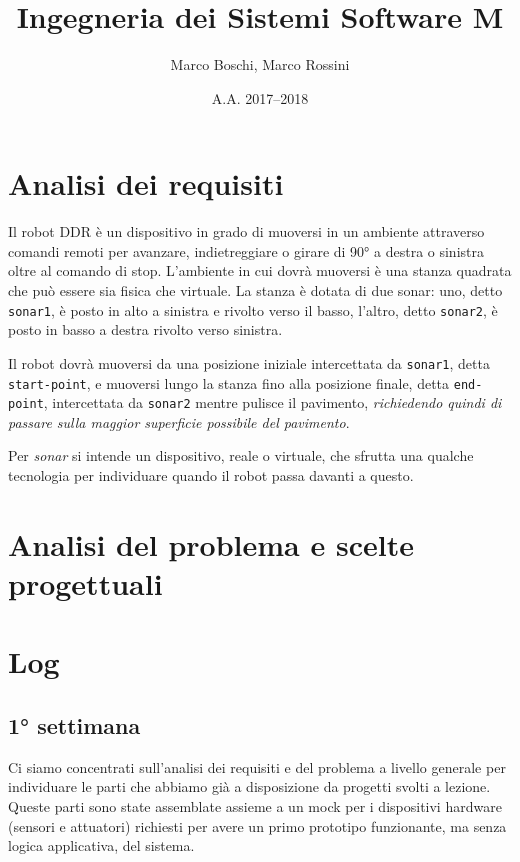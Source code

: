

\title{Ingegneria dei Sistemi Software M}
\date{A.A. 2017--2018}
\author{Marco Boschi, Marco Rossini}



\maketitletoc

\section{Analisi dei requisiti}
Il robot DDR è un dispositivo in grado di muoversi in un ambiente attraverso comandi remoti per avanzare, indietreggiare o girare di \ang{90} a destra o sinistra oltre al comando di stop. L'ambiente in cui dovrà muoversi è una stanza quadrata che può essere sia fisica che virtuale. La stanza è dotata di due sonar: uno, detto \texttt{sonar1}, è posto in alto a sinistra e rivolto verso il basso, l'altro, detto \texttt{sonar2}, è posto in basso a destra rivolto verso sinistra.

Il robot dovrà muoversi da una posizione iniziale intercettata da \texttt{sonar1}, detta \texttt{start-point}, e muoversi lungo la stanza fino alla posizione finale, detta \texttt{end-point}, intercettata da \texttt{sonar2} mentre pulisce il pavimento, \textit{richiedendo quindi di passare sulla maggior superficie possibile del pavimento}.

Per \textit{sonar} si intende un dispositivo, reale o virtuale, che sfrutta una qualche tecnologia per individuare quando il robot passa davanti a questo.

\section{Analisi del problema e scelte progettuali}

\section{Log}

\subsection{1° settimana}
Ci siamo concentrati sull'analisi dei requisiti e del problema a livello generale per individuare le parti che abbiamo già a disposizione da progetti svolti a lezione. Queste parti sono state assemblate assieme a un mock per i dispositivi hardware (sensori e attuatori) richiesti per avere un primo prototipo funzionante, ma senza logica applicativa, del sistema.


